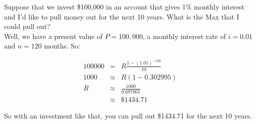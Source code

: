 \documentclass[10pt]{article}
\theoremstyle{definition}
\begin{document}
Suppose that we invest \$100,000 in an account that gives 1\% monthly interest and I'd like to pull money out for the next 10 years.  What is the Max that I could pull out?\\

Well, we have a present value of $P=100,000$, a monthly interest rate of $i=0.01$ and $n=120$ months.  So:

\begin{eqnarray*}
100000&=&R\frac{1-(1.01)^{-120}}{.01}\\
1000&\approx&R(1-0.302995)\\
R&\approx&\frac{1000}{0.697005}\\
&\approx&\$1434.71
\end{eqnarray*}

So with an investment like that, you can pull out \$1434.71 for the next 10 years.
\end{document}
